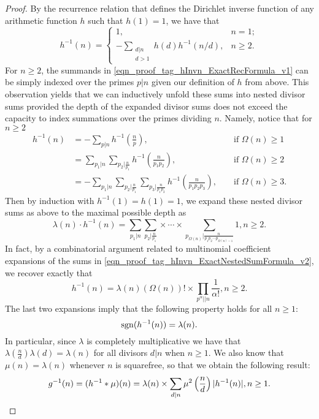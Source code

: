 \documentclass[11pt,reqno,a4letter]{article}
\numberwithin{figure}{section}
\numberwithin{table}{section}
\theoremstyle{plain}
\numberwithin{theorem}{section}
\theoremstyle{definition}
\begin{document}
\begin{proof}
By the recurrence relation that defines the Dirichlet inverse function of any 
arithmetic function $h$ such that $h(1) = 1$, we have that \cite[\S 2.7]{APOSTOLANUMT} 
\begin{equation} 
\label{eqn_proof_tag_hInvn_ExactRecFormula_v1}
h^{-1}(n) = \begin{cases} 
            1, & n = 1; \\ 
            -\sum\limits_{\substack{d|n \\ d>1}} h(d) h^{-1}(n/d), & n \geq 2. 
            \end{cases} 
\end{equation} 
For $n \geq 2$, the summands in \eqref{eqn_proof_tag_hInvn_ExactRecFormula_v1} 
can be simply indexed over the primes $p|n$ given our definition of $h$ from above. 
This observation yields that we can inductively 
unfold these sums into nested divisor sums provided the depth of the 
expanded divisor sums does not exceed the 
capacity to index summations over the primes dividing $n$. Namely, notice that for $n \geq 2$ 
\begin{align*} 
h^{-1}(n) & = -\sum_{p|n} h^{-1}\left(\frac{n}{p}\right), && \text{\ if\ } \Omega(n) \geq 1 \\ 
     & = \sum_{p_1|n} \sum_{p_2|\frac{n}{p_1}} h^{-1}\left(\frac{n}{p_1p_2}\right), && \text{\ if\ } \Omega(n) \geq 2 \\ 
     & = -\sum_{p_1|n} \sum_{p_2|\frac{n}{p_1}} \sum_{p_3|\frac{n}{p_1p_2}} h^{-1}\left(\frac{n}{p_1p_2p_3}\right), 
     && \text{\ if\ } \Omega(n) \geq 3. 
\end{align*} 
Then by induction with $h^{-1}(1) = h(1) = 1$, we expand these 
nested divisor sums as above to the maximal possible depth as 
\begin{equation} 
\label{eqn_proof_tag_hInvn_ExactNestedSumFormula_v2} 
\lambda(n) \cdot h^{-1}(n) = \sum_{p_1|n} \sum_{p_2|\frac{n}{p_1}} \times \cdots \times 
     \sum_{p_{\Omega(n)}|\frac{n}{p_1p_2 \cdots p_{\Omega(n)-1}}} 1, n \geq 2. 
\end{equation} 
In fact, by a combinatorial argument related to multinomial coefficient expansions of the sums in 
\eqref{eqn_proof_tag_hInvn_ExactNestedSumFormula_v2}, we recover exactly that 
\begin{equation} 
\label{eqn_proof_tag_hInvn_ExactNestedSumFormula_CombInterpetIdent_v3} 
h^{-1}(n) = \lambda(n) (\Omega(n))! \times \prod_{p^{\alpha} || n} \frac{1}{\alpha!}, n \geq 2. 
\end{equation} 
The last two expansions imply that the following property holds for all $n \geq 1$: 
\begin{equation} 
\notag 
\operatorname{sgn}(h^{-1}(n)) = \lambda(n). 
\end{equation} 
In particular, since $\lambda$ is completely multiplicative we have that 
$\lambda\left(\frac{n}{d}\right) \lambda(d) = \lambda(n)$ for all divisors 
$d|n$ when $n \geq 1$. We also know that $\mu(n) = \lambda(n)$ whenever $n$ is squarefree, 
so that we obtain the following result: 
\[
g^{-1}(n) = (h^{-1} \ast \mu)(n) = \lambda(n) \times \sum_{d|n} \mu^2\left(\frac{n}{d}\right) |h^{-1}(n)|, n \geq 1. 
     \qedhere 
\]
\end{proof} 
\end{document}

